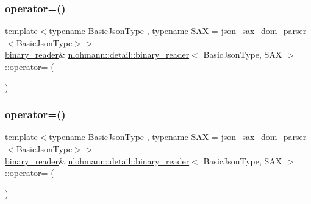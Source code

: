 \subsubsection{\texorpdfstring{operator=()}{operator=()}\hspace{0.1cm}{\footnotesize\ttfamily [1/2]}}
{\footnotesize\ttfamily template$<$typename Basic\+Json\+Type , typename S\+AX  = json\+\_\+sax\+\_\+dom\+\_\+parser$<$\+Basic\+Json\+Type$>$$>$ \\
\mbox{\hyperlink{classnlohmann_1_1detail_1_1binary__reader}{binary\+\_\+reader}}\& \mbox{\hyperlink{classnlohmann_1_1detail_1_1binary__reader}{nlohmann\+::detail\+::binary\+\_\+reader}}$<$ Basic\+Json\+Type, S\+AX $>$\+::operator= (\begin{DoxyParamCaption}\item[{const \mbox{\hyperlink{classnlohmann_1_1detail_1_1binary__reader}{binary\+\_\+reader}}$<$ Basic\+Json\+Type, S\+AX $>$ \&}]{ }\end{DoxyParamCaption})\hspace{0.3cm}{\ttfamily [delete]}}

\mbox{\label{classnlohmann_1_1detail_1_1binary__reader_a7ba0e555da725a2efa17048e67aec9a9}} 
\subsubsection{\texorpdfstring{operator=()}{operator=()}\hspace{0.1cm}{\footnotesize\ttfamily [2/2]}}
{\footnotesize\ttfamily template$<$typename Basic\+Json\+Type , typename S\+AX  = json\+\_\+sax\+\_\+dom\+\_\+parser$<$\+Basic\+Json\+Type$>$$>$ \\
\mbox{\hyperlink{classnlohmann_1_1detail_1_1binary__reader}{binary\+\_\+reader}}\& \mbox{\hyperlink{classnlohmann_1_1detail_1_1binary__reader}{nlohmann\+::detail\+::binary\+\_\+reader}}$<$ Basic\+Json\+Type, S\+AX $>$\+::operator= (\begin{DoxyParamCaption}\item[{\mbox{\hyperlink{classnlohmann_1_1detail_1_1binary__reader}{binary\+\_\+reader}}$<$ Basic\+Json\+Type, S\+AX $>$ \&\&}]{ }\end{DoxyParamCaption})\hspace{0.3cm}{\ttfamily [default]}}

